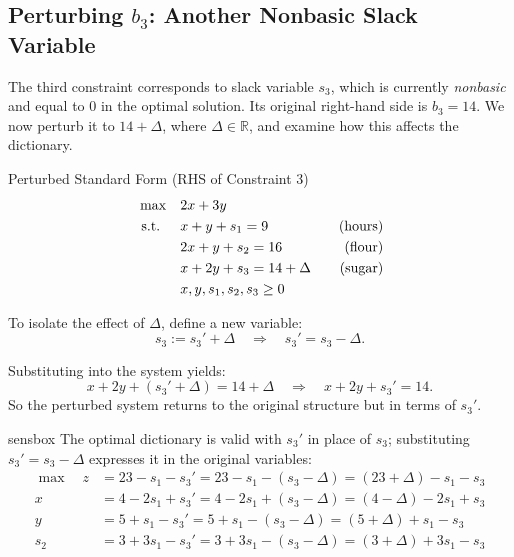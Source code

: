 \subsection{Perturbing \( b_3 \): Another Nonbasic Slack Variable}

The third constraint corresponds to slack variable \( s_3 \), which is currently \emph{nonbasic} and equal to 0 in the optimal solution. Its original right-hand side is \( b_3 = 14 \). We now perturb it to \( 14 + \Delta \), where \( \Delta \in \mathbb{R} \), and examine how this affects the dictionary.

\begin{sensdisplay}{Perturbed Standard Form (RHS of Constraint 3)}
\[
\begin{aligned}
\max \quad & 2x + 3y \\
\text{ s.t. } \quad
& x + y + s_1 = 9 \quad & \text{(hours)} \\
& 2x + y + s_2 = 16 \quad & \text{(flour)} \\
& x + 2y + s_3 = 14 + \Delta \quad & \text{(sugar)} \\
& x, y, s_1, s_2, s_3 \geq 0
\end{aligned}
\]

To isolate the effect of \( \Delta \), define a new variable:
\[
s_3 := s_3' + \Delta \quad \Rightarrow \quad s_3' = s_3 - \Delta.
\]

Substituting into the system yields:
\[
x + 2y + (s_3' + \Delta) = 14 + \Delta \quad \Rightarrow \quad x + 2y + s_3' = 14.
\]
So the perturbed system returns to the original structure but in terms of \( s_3' \).
\end{sensdisplay}

\begin{steppanel}{sensbox}
The optimal dictionary is valid with \( s_3' \) in place of \( s_3 \); substituting \( s_3' = s_3 - \Delta \) expresses it in the original variables:
\[
\begin{aligned}
\max \quad
z &= 23 - s_1 - s_3' = 23 - s_1 - (s_3 - \Delta) = (23 + \Delta) - s_1 - s_3 \\
x &= 4 - 2s_1 + s_3' = 4 - 2s_1 + (s_3 - \Delta) = (4 - \Delta) - 2s_1 + s_3 \\
y &= 5 + s_1 - s_3' = 5 + s_1 - (s_3 - \Delta) = (5 + \Delta) + s_1 - s_3 \\
s_2 &= 3 + 3s_1 - s_3' = 3 + 3s_1 - (s_3 - \Delta) = (3 + \Delta) + 3s_1 - s_3
\end{aligned}
\]
\end{steppanel}

